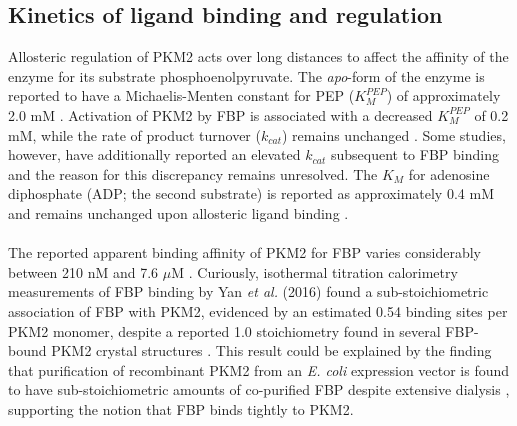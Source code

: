 \clearpage

\subsection{Kinetics of ligand binding and regulation}
Allosteric regulation of PKM2 acts over long distances to affect the affinity of the enzyme for its substrate phosphoenolpyruvate. The \textit{apo}-form of the enzyme is reported to have a Michaelis-Menten constant for PEP ($K_{M}^{PEP}$) of approximately 2.0 mM \cite{Dombrauckas:2005aa,Chaneton:2012aa,Ikeda:1998aa}. Activation of PKM2 by FBP is associated with a decreased $K_{M}^{PEP}$ of 0.2 mM, while the rate of product turnover ($k_{cat}$) remains unchanged \cite{Yacovan:2012aa,Jiang:2010aa,Dombrauckas:2005aa,Chaneton:2012aa}. Some studies, however, have additionally reported an elevated $k_{cat}$ subsequent to FBP binding \cite{Yuan:2018aa,Morgan:2013aa,Akhtar:2009aa} and the reason for this discrepancy remains unresolved. The $K_{M}$ for adenosine diphosphate (ADP; the second substrate) is reported as approximately 0.4 mM and remains unchanged upon allosteric ligand binding \cite{Ikeda:1998aa,Dombrauckas:2005aa,Chaneton:2012aa}.
%
%
\\\\
%
%
The reported apparent binding affinity of PKM2 for FBP varies considerably between 210 nM \cite{Yan:2016aa} and 7.6 $\mu$M \cite{Morgan:2013aa}. Curiously, isothermal titration calorimetry measurements of FBP binding by Yan \textit{et al.} (2016) \cite{Yan:2016aa} found a sub-stoichiometric association of FBP with PKM2, evidenced by an estimated 0.54 binding sites per PKM2 monomer, despite a reported 1.0 stoichiometry found in several FBP-bound PKM2 crystal structures \cite{Anastasiou:2012aa,Chaneton:2012aa,Christofk:2008aa,Dombrauckas:2005aa}. This result could be explained by the finding that purification of recombinant PKM2 from an \textit{E. coli} expression vector is found to have sub-stoichiometric amounts of co-purified FBP despite extensive dialysis \cite{Gavriilidou:2018aa,Christofk:2008aa,Morgan:2013aa}, supporting the notion that FBP binds tightly to PKM2.
%
%
\\\\
%
%
